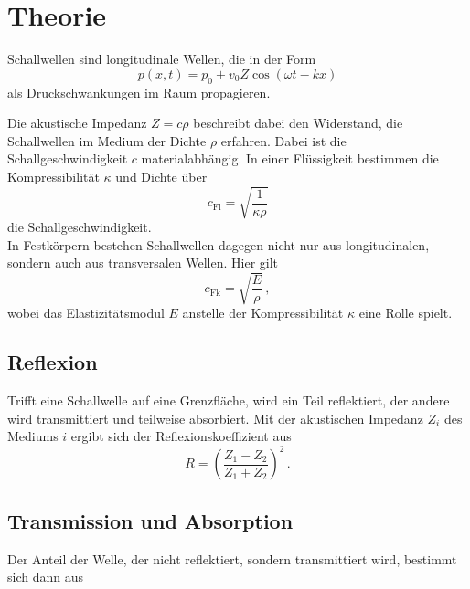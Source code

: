 \section{Theorie}
\label{sec:theorie}


Schallwellen sind longitudinale Wellen, die in der Form
\begin{equation}
    p(x, t) = p_0 + v_0 Z \cos(\omega t - k x)
    \label{eq:druckwelle}
\end{equation}
als Druckschwankungen im Raum propagieren.

Die akustische Impedanz $Z = c \rho$ beschreibt dabei den
Widerstand, die Schallwellen im Medium der Dichte $\rho$ %
erfahren.
Dabei ist die Schallgeschwindigkeit $c$ materialabhängig. In einer
Flüssigkeit bestimmen die Kompressibilität $\kappa$ %
und Dichte über
\begin{equation}
    c_\text{Fl} = \sqrt{\frac{1}{\kappa \rho}}
\end{equation}
die Schallgeschwindigkeit. \\

In Festkörpern bestehen Schallwellen dagegen nicht nur aus 
longitudinalen, sondern auch aus transversalen Wellen.%
Hier gilt
\begin{equation}
    c_\text{Fk} = \sqrt{\frac{E}{\rho}} \,,
\end{equation}
wobei das Elastizitätsmodul $E$ anstelle der Kompressibilität
$\kappa$ eine Rolle spielt. \\


\subsection{Reflexion}

Trifft eine Schallwelle auf eine Grenzfläche, wird ein Teil
reflektiert, der andere wird transmittiert und teilweise
absorbiert.
Mit der akustischen Impedanz $Z_i$ des Mediums $i$ ergibt sich
der Reflexionskoeffizient aus
\begin{equation}
    R = \left(\frac{Z_1 - Z_2}{Z_1 + Z_2}\right)^2 \,.
    \label{eq:reflexkoeff}
\end{equation}

\subsection{Transmission und Absorption}

Der Anteil der Welle, der nicht reflektiert, sondern transmittiert wird, bestimmt sich dann aus          %

